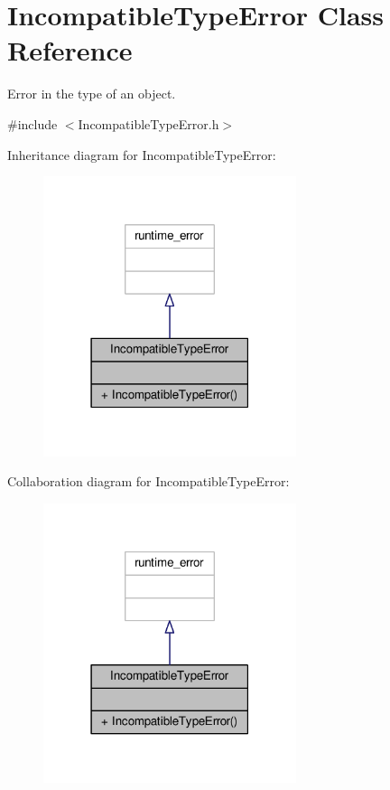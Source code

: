 \hypertarget{classIncompatibleTypeError}{}\section{Incompatible\+Type\+Error Class Reference}
\label{classIncompatibleTypeError}


Error in the type of an object.  




{\ttfamily \#include $<$Incompatible\+Type\+Error.\+h$>$}



Inheritance diagram for Incompatible\+Type\+Error\+:\nopagebreak
\begin{figure}[H]
\begin{center}
\leavevmode
\includegraphics[width=210pt]{classIncompatibleTypeError__inherit__graph}
\end{center}
\end{figure}


Collaboration diagram for Incompatible\+Type\+Error\+:\nopagebreak
\begin{figure}[H]
\begin{center}
\leavevmode
\includegraphics[width=210pt]{classIncompatibleTypeError__coll__graph}
\end{center}
\end{figure}
